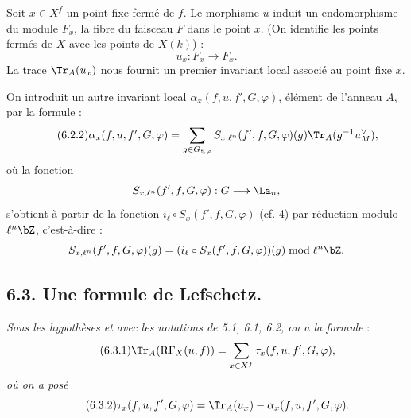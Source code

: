 Soit $x\in X^f$ un point fixe fermé de $f$. Le morphisme $u$ induit un endomorphisme du module $F_x$, la fibre du faisceau $F$ dans le point $x$. (On identifie les points fermés de $X$ avec les points de $X(k)$) :
\[
u_x:F_x\longrightarrow F_x .
\]
La trace $\Tr_A(u_x)$ nous fournit un premier invariant local associé au point fixe $x$.

On introduit un autre invariant local $\alpha_x(f,u,f',G,\varphi)$, élément de l'anneau $A$, par la formule :
\begin{equation}\tag{6.2.2}
\alpha_x(f,u,f',G,\varphi)=
\sum_{g\in G_{\natural,\varphi}}
S_{x,\ell^n}(f',f,G,\varphi)(g)\Tr_A(g^{-1}u_M^\vee),
\end{equation}
où la fonction
\[
S_{x,\ell^n}(f',f,G,\varphi):G\longrightarrow\La_n,
\]
s'obtient à partir de la fonction $i_\ell\circ S_x(f',f,G,\varphi)$ (cf. 4) par réduction modulo $\ell^n\bZ$, c'est-à-dire :\[
S_{x,\ell^n}(f',f,G,\varphi)(g)=
(i_\ell\circ S_x(f',f,G,\varphi))(g)\bmod \ell^n\bZ.
\]

\subsection*{6.3. Une formule de Lefschetz.}
\emph{Sous les hypothèses et avec les notations de 5.1, 6.1, 6.2, on a la formule} :
\begin{equation}
\tag{6.3.1}
\Tr_A(\mathrm{R}\Gamma_X(u,f))=\sum_{x\in X^f}\tau_x(f,u,f',G,\varphi),
\end{equation}
\emph{où on a posé}
\begin{equation}
\tag{6.3.2}
\tau_x(f,u,f',G,\varphi)=\Tr_A(u_x)-\alpha_x(f,u,f',G,\varphi).
\end{equation}

